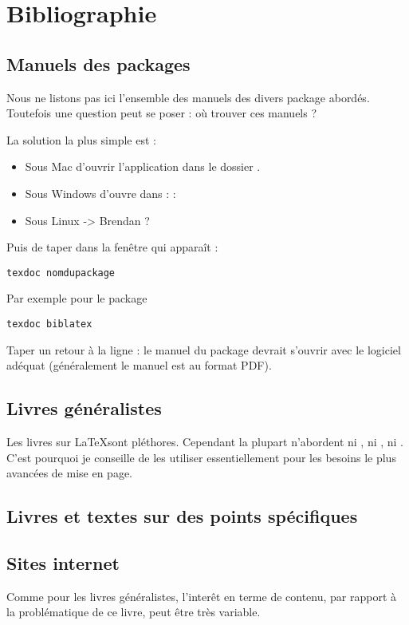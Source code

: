 \chapter{Bibliographie}

\nocite{*}
\section{Manuels des packages}

Nous ne listons pas ici l'ensemble des manuels des divers package abordés. Toutefois une question peut se poser : où trouver ces manuels ?

La solution la plus simple est :
\begin{itemize}
\item Sous Mac d'ouvrir l'application  dans le dossier .
\item Sous Windows d'ouvre  dans  :  : 
\item Sous Linux -> Brendan ?
\end{itemize}

Puis de taper dans la fenêtre qui apparaît :

\begin{verbatim}
texdoc nomdupackage
\end{verbatim}

Par exemple pour le package 

\begin{verbatim}
texdoc biblatex
\end{verbatim}

Taper un retour à la ligne : le manuel du package devrait s'ouvrir avec le logiciel adéquat (généralement le manuel est au format PDF).

\section{Livres généralistes}

Les livres sur \LaTeX sont pléthores. Cependant la plupart n'abordent ni \XeLaTeX, ni , ni . C'est pourquoi je conseille de les utiliser essentiellement pour les besoins le plus avancées de mise en page.

\printbibliography[keyword=generaliste]

\section{Livres et textes sur des points spécifiques}

\printbibliography[keyword=specifique]


\section{Sites internet}

Comme pour les livres généralistes,  l'interêt en terme de contenu, par rapport à la problématique de ce livre, peut être très variable. 

\printbibliography[keyword=site]
